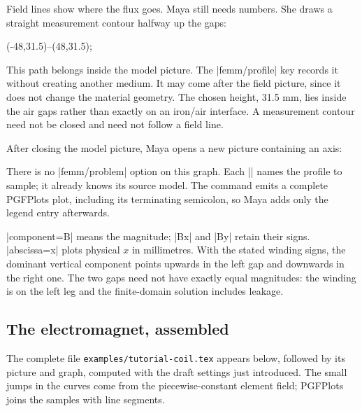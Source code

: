 Field lines show where the flux goes. Maya still needs numbers. She draws a
straight measurement contour halfway up the gaps:
\begin{codeexample}
\draw[femm/profile={name=coil-gap,samples=101},
  violet,dashed,thick,-Stealth] (-48,31.5)--(48,31.5);
\end{codeexample}
This path belongs inside the model picture. The |femm/profile| key records
it without creating another medium. It may come after the field picture,
since it does not change the material geometry. The chosen height, 31.5 mm,
lies inside the air gaps rather than exactly on an iron/air interface.
A measurement contour need not be closed and need not follow a field line.

After closing the model picture, Maya opens a new picture containing an axis:
\begin{codeexample}
\end{codeexample}
There is no |femm/problem| option on this graph. Each |\femmplot| names the
profile to sample; it already knows its source model. The command emits a
complete PGFPlots plot, including its terminating semicolon, so Maya adds
only the legend entry afterwards.

|component=B| means the magnitude; |Bx| and |By| retain their signs.
|abscissa=x| plots physical $x$ in millimetres. With the stated winding signs,
the dominant vertical component points upwards in the left gap and downwards
in the right one. The two gaps need not have exactly equal magnitudes:
the winding is on the left leg and the finite-domain solution includes leakage.

\clearpage
\subsection{The electromagnet, assembled}
\label{sec:tutorial-coil-result}
The complete file \nolinkurl{examples/tutorial-coil.tex} appears below, followed
by its picture and graph, computed with the draft settings just introduced.
The small jumps in the curves come from the
piecewise-constant element field; PGFPlots joins the samples with line segments.


